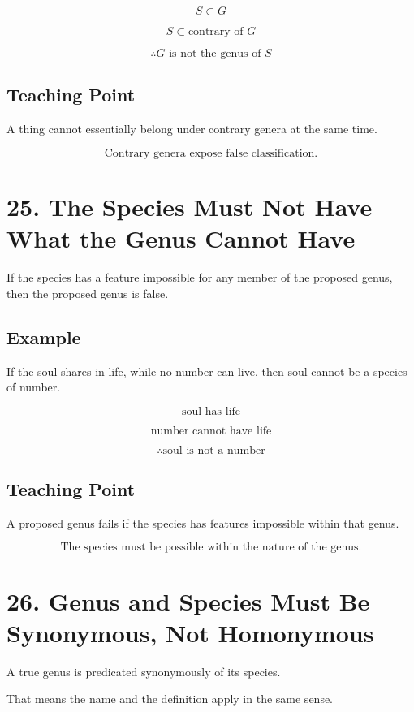 \documentclass[12pt]{article}
\begin{document}
\[
S \subset G
\]

\[
S \subset \text{contrary of } G
\]

\[
\therefore G \text{ is not the genus of } S
\]

\subsection*{Teaching Point}

A thing cannot essentially belong under contrary genera at the same time.

\[
\boxed{
\text{Contrary genera expose false classification.}
}
\]

\section*{25. The Species Must Not Have What the Genus Cannot Have}

If the species has a feature impossible for any member of the proposed genus,
then the proposed genus is false.

\subsection*{Example}

If the soul shares in life, while no number can live, then soul cannot be a
species of number.

\[
\text{soul has life}
\]

\[
\text{number cannot have life}
\]

\[
\therefore \text{soul is not a number}
\]

\subsection*{Teaching Point}

A proposed genus fails if the species has features impossible within that genus.

\[
\boxed{
\text{The species must be possible within the nature of the genus.}
}
\]

\section*{26. Genus and Species Must Be Synonymous, Not Homonymous}

A true genus is predicated synonymously of its species.

That means the name and the definition apply in the same sense.
\end{document}

